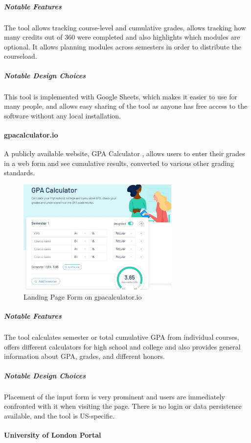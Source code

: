 \subparagraph{Notable Features}
The tool allows tracking course-level and cumulative grades, allows tracking how many credits out of 360 were completed and also highlights which modules are optional. It allows planning modules across semesters in order to distribute the courseload.

\subparagraph{Notable Design Choices}
This tool is implemented with Google Sheets, which makes it easier to use for many people, and allows easy sharing of the tool as anyone has free access to the software without any local installation.

\paragraph{gpacalculator.io}

A publicly available website, GPA Calculator \cite{gpa_calculator}, allows users to enter their grades in a web form and see cumulative results, converted to various other grading standards.

\begin{figure}[H] 
\noindent \includegraphics[width=8cm]{gpa-calculator-io}
\centering
\caption{Landing Page Form on gpacalculator.io}
\label{fig:gpa-calc}
\end{figure}
\medskip

\subparagraph{Notable Features}
The tool calculates semester or total cumulative GPA from individual courses, offers different calculators for high school and college and also provides general information about GPA, grades, and different honors.

\subparagraph{Notable Design Choices}
Placement of the input form is very prominent and users are immediately confronted with it when visiting the page. There is no login or data persistence available, and the tool is US-specific.

\paragraph{University of London Portal}

